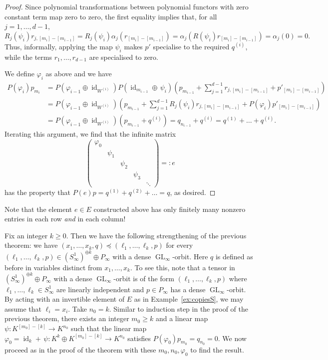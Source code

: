 \documentclass{amsart}
\theoremstyle{plain}
\theoremstyle{definition}
\DeclareMathOperator{\id}{id}
\renewcommand{\phi}{\varphi}
\DeclareMathOperator{\GL}{GL}
\begin{document}
\begin{proof}
Since polynomial transformations between polynomial functors
with zero constant term map zero to zero, the first equality
implies that, for all $j=1,\ldots,d-1$,
\[
R_j(\psi_i)r_{j,[m_i]-[m_{i-1}]}=R_j(\psi_i)\alpha_j(r_{[m_i]-[m_{i-1}]})
= \alpha_j(R(\psi_i)r_{[m_i]-[m_{i-1}]}) = \alpha_j(0)=0.
\]
Thus, informally, applying the map $\psi_i$ makes $p'$
specialise to the required $q^{(i)}$, while the terms
$r_1,\ldots,r_{d-1}$ are specialised to zero.

We define $\phi_i$ as above and we have
\begin{align*}
P(\phi_i)p_{m_i}&=P(\phi_{i-1}\oplus\id_{W^{(i)}}) P(\id_{m_{i-1}}\oplus\,\psi_i)\left(p_{m_{i-1}} + \sum_{j=1}^{d-1}r_{j,[m_i]-[m_{i-1}]} + p'_{[m_i]-[m_{i-1}]}\right)\\
&=P(\phi_{i-1}\oplus\id_{W^{(i)}}) \left(p_{m_{i-1}} + \sum_{j=1}^{d-1}R_j(\psi_i)r_{j,[m_i]-[m_{i-1}]}+ P(\phi_i)p'_{[m_i]-[m_{i-1}]}\right)\\
&=P(\phi_{i-1}\oplus\id_{W^{(i)}})(p_{m_{i-1}}+q^{(i)})=q_{n_{i-1}}+q^{(i)}=q^{(1)}+\ldots+q^{(i)}.
\end{align*}
Iterating this argument, we find that the infinite matrix
\[
\begin{pmatrix}\phi_0\\&\psi_1\\&&\psi_2\\&&&\psi_3\\&&&&\ddots\end{pmatrix}=: e
\]
has the property that $P(e)p=q^{(1)}+q^{(2)}+\ldots=q$, as desired.
\end{proof}

\begin{re}
Note that the element $e \in E$ constructed above has only finitely many
nonzero entries in each row {\em and} in each column!
\end{re}

\begin{re}\label{re:addingS1s}
Fix an integer $k\geq0$. Then we have the following strengthening of the previous theorem: we have $(x_1,\ldots,x_k,q)\preceq (\ell_1,\ldots,\ell_k,p)$ for every $(\ell_1,\ldots,\ell_k,p)\in (S^1_{\infty})^{\oplus k}\oplus P_{\infty}$ with a dense $\GL_{\infty}$-orbit. Here $q$ is defined as before in variables distinct from $x_1,\ldots,x_k$. To see this, note that a tensor in $(S^1_{\infty})^{\oplus k}\oplus P_{\infty}$ with a dense $\GL_{\infty}$-orbit is of the form $(\ell_1,\ldots,\ell_k,p)$ where $\ell_1,\ldots,\ell_k\in S^1_{\infty}$ are linearly independent and $p\in P_{\infty}$ has a dense $\GL_{\infty}$-orbit. By acting with an invertible element of $E$ as in Example~\ref{ex:copiesS}, we may assume that $\ell_i=x_i$. Take $n_0=k$. Similar to induction step in the proof of the previous theorem, there exists an integer $m_0\geq k$ and a linear map $\psi\colon K^{[m_0]-[k]}\to K^{n_0}$ such that the linear map $\phi_0=\id_k+\,\psi\colon K^k\oplus K^{[m_0]-[k]}\to K^{n_0}$ satisfies $P(\phi_0)p_{m_0}=q_{n_0}=0$. We now proceed as in the proof of the theorem with these $m_0,n_0,\phi_0$ to find the result.
\end{re}
\end{document}
